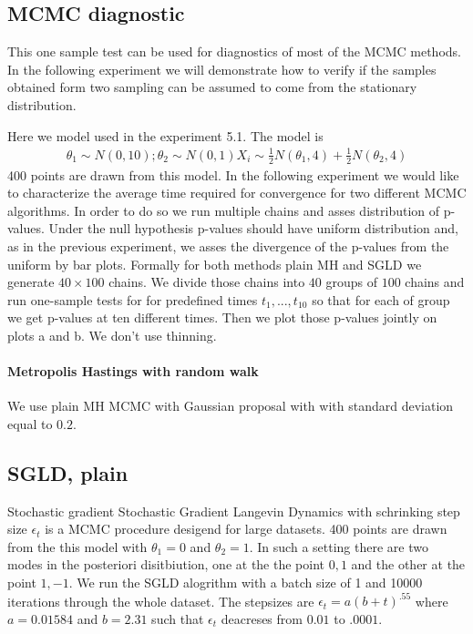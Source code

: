 \documentclass{article}
\begin{document}

\subsection{MCMC diagnostic}
This one sample test can be used for diagnostics of most of the MCMC methods. In the following experiment we will demonstrate how to verify if the samples obtained form two sampling can be assumed to come from the stationary distribution.  

Here we model used in the experiment 5.1. The model is 
\begin{align}
 \theta_1 \sim N(0,10) ; \theta_2 \sim N(0,1)
 X_i \sim \frac {1}{2} N(\theta_1,4) + \frac{1}{2} N(\theta_2,4) 
\end{align}
400 points are drawn from this model. In the following experiment we would like to characterize the average time required for convergence for two different MCMC algorithms. In order to do so we run multiple chains and asses distribution of p-values. Under the null hypothesis p-values should have uniform distribution and, as in the previous experiment, we asses the divergence of the p-values from the uniform by bar plots. Formally for both methods plain MH and SGLD we generate $40 \times 100$ chains. We divide those chains into $40$ groups of $100$ chains and run one-sample tests for for predefined times $t_1,...,t_10$  so that for each of group we get p-values at ten different times. Then we plot those p-values jointly on plots a and b. We don't use thinning.  


\paragraph{Metropolis Hastings with random walk}
We use plain MH MCMC with Gaussian proposal with with standard deviation equal to  $0.2$.   

\subsection{SGLD, plain }
Stochastic gradient  Stochastic Gradient Langevin Dynamics  with schrinking step size $\epsilon_t$ is a MCMC procedure desigend for large datasets. 
400 points are drawn from the this model with $\theta_1 = 0$ and $\theta_2= 1$. In such a setting there are two modes in the posteriori disitbiution, one at the the point $0,1$ and the other at the point $1,-1$. We run the SGLD alogrithm with a batch size of 1 and 10000 iterations through the whole dataset. The stepsizes are $\epsilon_t = a(b+t)^{.55}$ where $ a = 0.01584$ and $b=2.31$ such that $\epsilon_t$ deacreses from $0.01$ to $.
0001$. 
\end{document}
